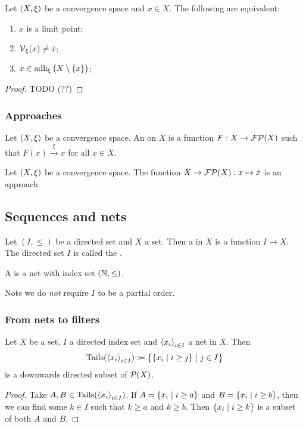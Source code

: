 \begin{proposition}
Let $\sSet{X,\xi}$ be a convergence space and $x\in X$. The following are equivalent:
\begin{enumerate}
\item $x$ is a limit point;
\item $\operatorname{\mathcal{V}}_\xi(x) \neq \dot{x}$;
\item $x\in \operatorname{adh}_\xi\big(X\setminus\{x\}\big)$;
\end{enumerate}
\end{proposition}
\begin{proof}
TODO (??)
\end{proof}

\subsubsection{Approaches}
\begin{definition}
Let $\sSet{X,\xi}$ be a convergence space. An  on $X$ is a function $F: X\to \operatorname{\mathcal{FP}}(X)$ such that $F(x) \overset{\xi}{\longrightarrow} x$ for all $x\in X$.
\end{definition}

\begin{lemma}
Let $\sSet{X,\xi}$ be a convergence space. The function $X\to \operatorname{\mathcal{FP}}(X): x\mapsto \dot{x}$ is an approach.
\end{lemma}

\subsection{Sequences and nets}
\begin{definition}
Let $(I,\leq)$ be a directed set and $X$ a set. Then a  in $X$ is a function $I\to X$. The directed set $I$ is called the .

A  is a net with index set $\sSet{\N, \leq}$.
\end{definition}
Note we do \emph{not} require $I$ to be a partial order.

\subsubsection{From nets to filters}
\begin{lemma} \label{tailsDownwardsDirected}
Let $X$ be a set, $I$ a directed index set and $\left\langle x_i \right\rangle_{i\in I}$ a net in $X$. Then
\[ \Tails(\seq{x_i}_{i\in I}) \defeq \setbuilder[\big]{\setbuilder{x_i}{i \geq j}}{j\in I} \]
is a downwards directed subset of $\operatorname{\mathcal{P}}(X)$.
\end{lemma}
\begin{proof}
Take $A,B\in \operatorname{Tails}(\left\langle x_i \right\rangle_{i\in I})$. If $A = \setbuilder{x_i}{i \geq a}$ and $B = \setbuilder{x_i}{i \geq b}$, then we can find some $k\in I$ such that $k \geq a$ and $k\geq b$. Then $\setbuilder{x_i}{i \geq k}$ is a subset of both $A$ and $B$.
\end{proof}

